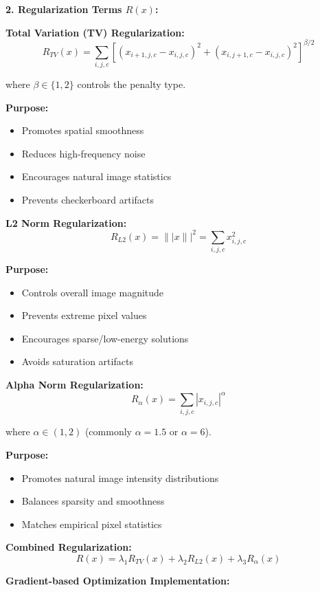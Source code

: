 \documentclass[12pt]{article}
\begin{document}
\begin{enumerate}[(a)]
{    \textbf{2. Regularization Terms $R(x)$:}
    
    \textbf{Total Variation (TV) Regularization:}
    $$R_{TV}(x) = \sum_{i,j,c} \left[(x_{i+1,j,c} - x_{i,j,c})^2 + (x_{i,j+1,c} - x_{i,j,c})^2\right]^{\beta/2}$$
    
    where $\beta \in \{1, 2\}$ controls the penalty type.
    
    \textbf{Purpose:}
    \begin{itemize}
        \item Promotes spatial smoothness
        \item Reduces high-frequency noise
        \item Encourages natural image statistics
        \item Prevents checkerboard artifacts
    \end{itemize}
    
    \textbf{L2 Norm Regularization:}
    $$R_{L2}(x) = \||x\||^2 = \sum_{i,j,c} x_{i,j,c}^2$$
    
    \textbf{Purpose:}
    \begin{itemize}
        \item Controls overall image magnitude
        \item Prevents extreme pixel values
        \item Encourages sparse/low-energy solutions
        \item Avoids saturation artifacts
    \end{itemize}
    
    \textbf{Alpha Norm Regularization:}
    $$R_{\alpha}(x) = \sum_{i,j,c} |x_{i,j,c}|^\alpha$$
    
    where $\alpha \in (1, 2)$ (commonly $\alpha = 1.5$ or $\alpha = 6$).
    
    \textbf{Purpose:}
    \begin{itemize}
        \item Promotes natural image intensity distributions
        \item Balances sparsity and smoothness
        \item Matches empirical pixel statistics
    \end{itemize}
    
    \textbf{Combined Regularization:}
    $$R(x) = \lambda_1 R_{TV}(x) + \lambda_2 R_{L2}(x) + \lambda_3 R_{\alpha}(x)$$
    
    \textbf{Gradient-based Optimization Implementation:}
    
}
\end{enumerate}
\end{document}
